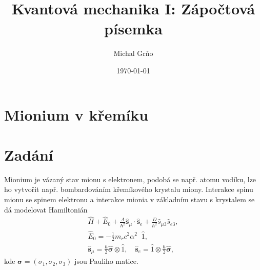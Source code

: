 \documentclass[10pt,a4paper]{article}
\begin{document}
\title{Kvantová mechanika I: Zápočtová písemka}
\author{Michal Grňo}
\date{\today}

\maketitle

\section{Mionium v křemíku}

\section{Zadání}
Mionium je vázaný stav mionu s elektronem, podobá se např. atomu vodíku, lze ho vytvořit např. bombardováním křemíkového krystalu miony. Interakce spinu mionu se spinem elektronu a interakce mionia v základním stavu s krystalem se dá modelovat Hamiltonián
\begin{gather*}
    \hat{H} + \hat{E}_0 + \frac{A}{\hbar^2} \hat{\bm{s}}_\mu \cdot \hat{\bm{s}}_e + \frac{D}{\hbar^2} \hat{s}_{\mu 3} \hat{s}_{e 3},
    \\[10pt]
    \hat{E}_0 = - \tfrac{1}{2} m_r c^2 \alpha^2 \;\; \hat{1},
    \\[10pt]
    \hat{\bm{s}}_\mu = \tfrac{\hbar}{2} \hat{\bm{\sigma}} \otimes \hat{1},
    \hspace{1em}
    \hat{\bm{s}}_e = \hat{1} \otimes \tfrac{\hbar}{2} \hat{\bm{\sigma}},
\end{gather*}
kde $\bm{\sigma} = (\sigma_1, \sigma_2, \sigma_3)$ jsou Pauliho matice.
\end{document}
